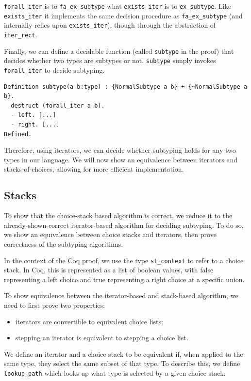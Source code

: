 \documentclass[a4paper,english]{lipics-v2018}
\begin{document}
\verb|forall_iter| is to \verb|fa_ex_subtype| what \verb|exists_iter| is to
\verb|ex_subtype|. Like \verb|exists_iter| it implements the same decision procedure
as \verb|fa_ex_subtype| (and internally relies upon \verb|exists_iter|), though through
the abstraction of \verb|iter_rect|.

Finally, we can define a decidable function (called \verb|subtype| in the proof)
that decides whether two types are subtypes or not. \verb|subtype| simply invokes
\verb|forall_iter| to decide subtyping.

\begin{verbatim}
Definition subtype(a b:type) : {NormalSubtype a b} + {~NormalSubtype a b}.
  destruct (forall_iter a b).
  - left. [...]
  - right. [...]
Defined.
\end{verbatim}

Therefore, using iterators, we can decide whether subtyping holds for any two types
in our language. We will now show an equivalence between iterators and stacks-of-choices,
allowing for more efficient implementation.

\subsection{Stacks}

To show that the choice-stack based algorithm is correct, we reduce it to the
already-shown-correct iterator-based algorithm for deciding subtyping. To do so,
we show an equivalence between choice stacks and iterators, then prove correctness
of the subtyping algorithms.

In the context of the Coq proof, we use the type \verb|st_context| to refer
to a choice stack. In Coq, this is represented as a list of boolean values,
with false representing a left choice and true representing a right choice at
a specific union.

To show equivalence between the iterator-based and stack-based algorithm, we need to
first prove two properties:

\begin{itemize}
  \item iterators are convertible to equivalent choice lists;
  \item stepping an iterator is equivalent to stepping a choice list.
\end{itemize}

We define an iterator and a choice stack to be equivalent if, when applied to
the same type, they select the same subset of that type. To describe this, we
define \verb|lookup_path| which looks up what type is selected by a given
choice stack.
\end{document}
